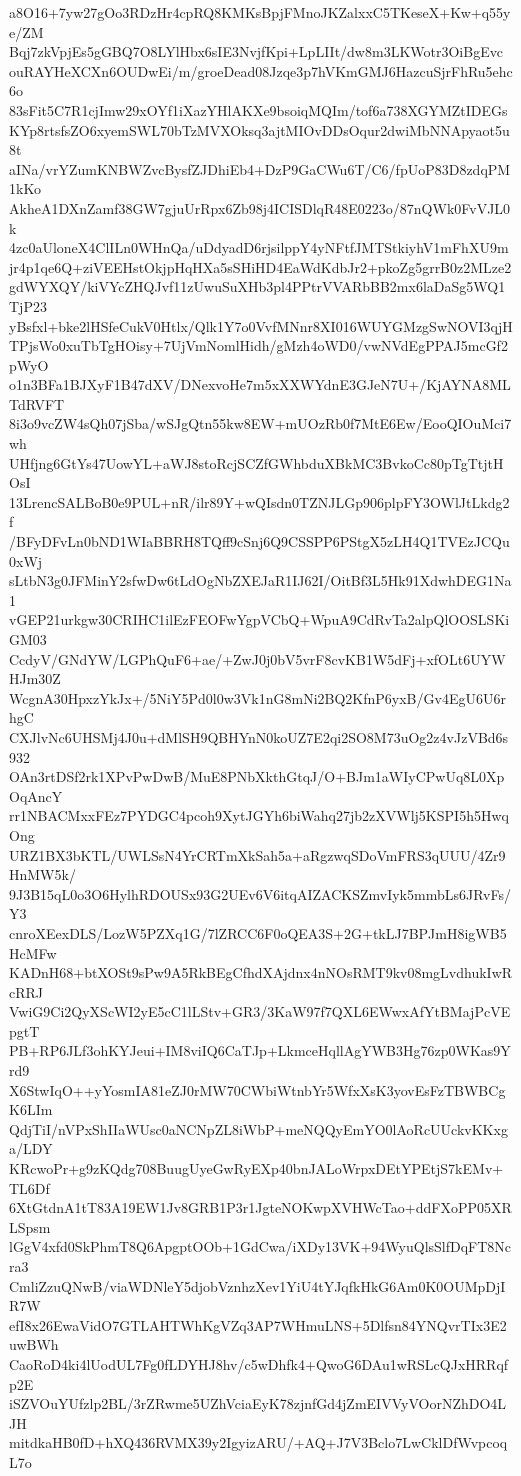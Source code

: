 a8O16+7yw27gOo3RDzHr4cpRQ8KMKsBpjFMnoJKZalxxC5TKeseX+Kw+q55ye/ZM
Bqj7zkVpjEs5gGBQ7O8LYlHbx6sIE3NvjfKpi+LpLIIt/dw8m3LKWotr3OiBgEvc
ouRAYHeXCXn6OUDwEi/m/groeDead08Jzqe3p7hVKmGMJ6HazcuSjrFhRu5ehc6o
83sFit5C7R1cjImw29xOYf1iXazYHlAKXe9bsoiqMQIm/tof6a738XGYMZtIDEGs
KYp8rtsfsZO6xyemSWL70bTzMVXOksq3ajtMIOvDDsOqur2dwiMbNNApyaot5u8t
aINa/vrYZumKNBWZvcBysfZJDhiEb4+DzP9GaCWu6T/C6/fpUoP83D8zdqPM1kKo
AkheA1DXnZamf38GW7gjuUrRpx6Zb98j4ICISDlqR48E0223o/87nQWk0FvVJL0k
4zc0aUloneX4ClILn0WHnQa/uDdyadD6rjsilppY4yNFtfJMTStkiyhV1mFhXU9m
jr4p1qe6Q+ziVEEHstOkjpHqHXa5sSHiHD4EaWdKdbJr2+pkoZg5grrB0z2MLze2
gdWYXQY/kiVYcZHQJvf11zUwuSuXHb3pl4PPtrVVARbBB2mx6laDaSg5WQ1TjP23
yBsfxl+bke2lHSfeCukV0Htlx/Qlk1Y7o0VvfMNnr8XI016WUYGMzgSwNOVI3qjH
TPjsWo0xuTbTgHOisy+7UjVmNomlHidh/gMzh4oWD0/vwNVdEgPPAJ5mcGf2pWyO
o1n3BFa1BJXyF1B47dXV/DNexvoHe7m5xXXWYdnE3GJeN7U+/KjAYNA8MLTdRVFT
8i3o9vcZW4sQh07jSba/wSJgQtn55kw8EW+mUOzRb0f7MtE6Ew/EooQIOuMci7wh
UHfjng6GtYs47UowYL+aWJ8stoRcjSCZfGWhbduXBkMC3BvkoCc80pTgTtjtHOsI
13LrencSALBoB0e9PUL+nR/ilr89Y+wQIsdn0TZNJLGp906plpFY3OWlJtLkdg2f
/BFyDFvLn0bND1WIaBBRH8TQff9cSnj6Q9CSSPP6PStgX5zLH4Q1TVEzJCQu0xWj
sLtbN3g0JFMinY2sfwDw6tLdOgNbZXEJaR1IJ62I/OitBf3L5Hk91XdwhDEG1Na1
vGEP21urkgw30CRIHC1ilEzFEOFwYgpVCbQ+WpuA9CdRvTa2alpQlOOSLSKiGM03
CcdyV/GNdYW/LGPhQuF6+ae/+ZwJ0j0bV5vrF8cvKB1W5dFj+xfOLt6UYWHJm30Z
WcgnA30HpxzYkJx+/5NiY5Pd0l0w3Vk1nG8mNi2BQ2KfnP6yxB/Gv4EgU6U6rhgC
CXJlvNc6UHSMj4J0u+dMlSH9QBHYnN0koUZ7E2qi2SO8M73uOg2z4vJzVBd6s932
OAn3rtDSf2rk1XPvPwDwB/MuE8PNbXkthGtqJ/O+BJm1aWIyCPwUq8L0XpOqAncY
rr1NBACMxxFEz7PYDGC4pcoh9XytJGYh6biWahq27jb2zXVWlj5KSPI5h5HwqOng
URZ1BX3bKTL/UWLSsN4YrCRTmXkSah5a+aRgzwqSDoVmFRS3qUUU/4Zr9HnMW5k/
9J3B15qL0o3O6HylhRDOUSx93G2UEv6V6itqAIZACKSZmvIyk5mmbLs6JRvFs/Y3
cnroXEexDLS/LozW5PZXq1G/7lZRCC6F0oQEA3S+2G+tkLJ7BPJmH8igWB5HcMFw
KADnH68+btXOSt9sPw9A5RkBEgCfhdXAjdnx4nNOsRMT9kv08mgLvdhukIwRcRRJ
VwiG9Ci2QyXScWI2yE5cC1lLStv+GR3/3KaW97f7QXL6EWwxAfYtBMajPcVEpgtT
PB+RP6JLf3ohKYJeui+IM8viIQ6CaTJp+LkmceHqllAgYWB3Hg76zp0WKas9Yrd9
X6StwIqO++yYosmIA81eZJ0rMW70CWbiWtnbYr5WfxXsK3yovEsFzTBWBCgK6LIm
QdjTiI/nVPxShIIaWUsc0aNCNpZL8iWbP+meNQQyEmYO0lAoRcUUckvKKxga/LDY
KRcwoPr+g9zKQdg708BuugUyeGwRyEXp40bnJALoWrpxDEtYPEtjS7kEMv+TL6Df
6XtGtdnA1tT83A19EW1Jv8GRB1P3r1JgteNOKwpXVHWcTao+ddFXoPP05XRLSpsm
lGgV4xfd0SkPhmT8Q6ApgptOOb+1GdCwa/iXDy13VK+94WyuQlsSlfDqFT8Ncra3
CmliZzuQNwB/viaWDNleY5djobVznhzXev1YiU4tYJqfkHkG6Am0K0OUMpDjIR7W
efI8x26EwaVidO7GTLAHTWhKgVZq3AP7WHmuLNS+5Dlfsn84YNQvrTIx3E2uwBWh
CaoRoD4ki4lUodUL7Fg0fLDYHJ8hv/c5wDhfk4+QwoG6DAu1wRSLcQJxHRRqfp2E
iSZVOuYUfzlp2BL/3rZRwme5UZhVciaEyK78zjnfGd4jZmEIVVyVOorNZhDO4LJH
mitdkaHB0fD+hXQ436RVMX39y2IgyizARU/+AQ+J7V3Bclo7LwCklDfWvpcoqL7o
